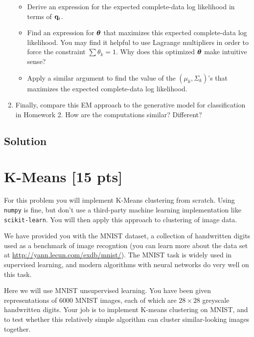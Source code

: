 \documentclass[submit]{harvardml}
\begin{document}
\begin{problem}
\begin{enumerate}
\begin{itemize}
    \item Derive an expression for the expected complete-data log likelihood in terms of $\mathbf{q}_i$.
    \item Find an expression for $\boldsymbol{\theta}$ that maximizes this expected complete-data log likelihood. You may find it helpful to use Lagrange multipliers in order to force the constraint $\sum \theta_k = 1$. Why does this optimized $\boldsymbol{\theta}$ make intuitive sense?
    \item Apply a similar argument to find the value of the $(\mu_k,\Sigma_k)$'s that maximizes the expected complete-data log likelihood. 
\end{itemize}

\item Finally, compare this EM approach to the generative model for
classification in Homework 2.  How are the computations similar?
Different? 

\end{enumerate}


  
\end{problem}

\subsection*{Solution}


\newpage

\section*{K-Means [15 pts]} %

For this problem you will implement  K-Means clustering from scratch. Using \texttt{numpy} is fine,
but don't use a third-party machine learning implementation like \texttt{scikit-learn}. You will
then apply this approach to clustering of image data.  



We have provided you with the MNIST dataset, a collection of handwritten digits used as a benchmark
of image recogntion (you  can learn more about the data set at
\url{http://yann.lecun.com/exdb/mnist/}). The MNIST task is widely used in supervised learning, and
modern algorithms with neural networks do very well on this task. 

Here we will use MNIST unsupervised learning. You have been given representations of 6000 MNIST
images, each of which are $28\times28$ greyscale handwritten digits. Your job is to implement
K-means clustering on MNIST, and to test whether this relatively simple algorithm can cluster
similar-looking images together.
\end{document}
